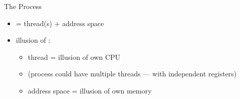 \begin{frame}{The Process}
\begin{itemize}
\item {} = thread(s) + address space
\item illusion of :
\begin{itemize}
\item thread = illusion of own CPU
\item (process could have multiple threads --- with independent registers)
\item address space = illusion of own memory
\end{itemize}
\end{itemize}
\end{frame}

